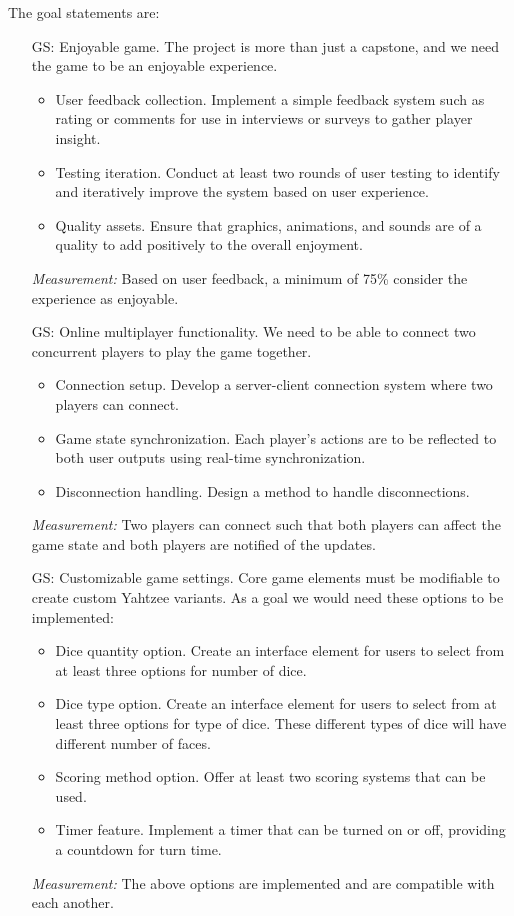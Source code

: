 The goal statements are:

\begin{itemize}

	\item[GS\refstepcounter{goalnum}\thegoalnum \label{G_enjoyable}:] Enjoyable game. The project is more than just a capstone, and we need the game to be an enjoyable experience.
	\begin{itemize}
        \item User feedback collection. Implement a simple feedback system such as rating or comments for use in interviews or surveys to gather player insight.
        \item Testing iteration. Conduct at least two rounds of user testing to identify and iteratively improve the system based on user experience.
        \item Quality assets. Ensure that graphics, animations, and sounds are of a quality to add positively to the overall enjoyment.
    \end{itemize}
	\textit{Measurement:} Based on user feedback, a minimum of 75\% consider the experience as enjoyable.

	\item[GS\refstepcounter{goalnum}\thegoalnum \label{G_multiplayer}:] Online multiplayer functionality. We need to be able to connect two concurrent players to play the game together.
	\begin{itemize}
        \item Connection setup. Develop a server-client connection system where two players can connect.
        \item Game state synchronization. Each player's actions are to be reflected to both user outputs using real-time synchronization.
        \item Disconnection handling. Design a method to handle disconnections.
    \end{itemize}
	\textit{Measurement:} Two players can connect such that both players can affect the game state and both players are notified of the updates.

	\item[GS\refstepcounter{goalnum}\thegoalnum \label{G_customization}:] Customizable game settings. Core game elements must be modifiable to create custom Yahtzee variants. As a goal we would need these options to be implemented:
	\begin{itemize}
        \item Dice quantity option. Create an interface element for users to select from at least three options for number of dice.
        \item Dice type option. Create an interface element for users to select from at least three options for type of dice. These different types of dice will have different number of faces.
        \item Scoring method option. Offer at least two scoring systems that can be used.
        \item Timer feature. Implement a timer that can be turned on or off, providing a countdown for turn time.
    \end{itemize}
	\textit{Measurement:} The above options are implemented and are compatible with each another.
	

\end{itemize}
